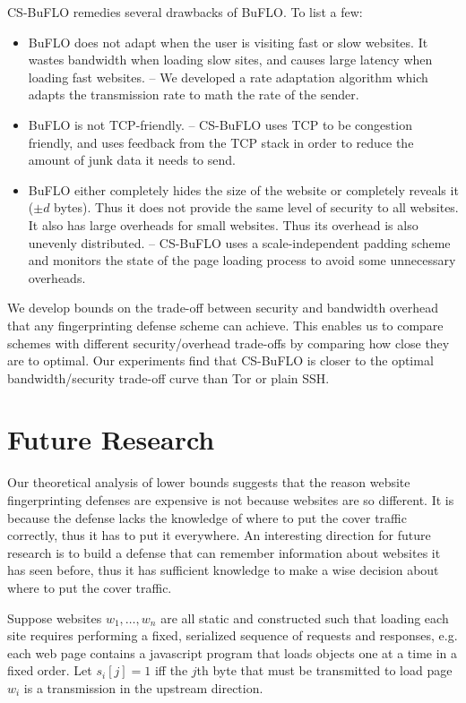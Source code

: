 \documentclass[11pt,oneside]{article}
\newcommand{\buflo} {BuFLO\xspace}
\newcommand{\csb} {CS-BuFLO\xspace}
\begin{document}
\csb remedies several drawbacks of \buflo. To list a few:
\begin{itemize}

\item
\buflo does not adapt when the user is visiting fast or slow websites. It wastes bandwidth when loading slow
sites, and causes large latency when loading fast websites. -- We developed a rate adaptation algorithm which adapts the transmission rate to math the rate of the sender.

\item
\buflo is not TCP-friendly. -- \csb uses TCP to be congestion friendly, and uses feedback from the TCP stack in order to reduce the amount of junk data it needs to send.

\item
\buflo either completely hides the size of the website or completely reveals it ($\pm d$ bytes).  Thus it does not provide the same level of security to all websites. It also has large overheads for small websites.  Thus its overhead is also unevenly distributed. -- \csb uses a scale-independent padding scheme and monitors the state of the page loading process to avoid some unnecessary overheads.

\end{itemize}

We develop bounds on the trade-off between security and bandwidth overhead that any fingerprinting defense scheme can achieve. This enables us to compare schemes with different security/overhead trade-offs by comparing how close they are to optimal. Our experiments find that \csb is closer to the optimal bandwidth/security trade-off curve than Tor or plain SSH.

\section{Future Research}

Our theoretical analysis of lower bounds suggests that the reason website fingerprinting defenses are expensive is not because
websites are so different. It is because the defense lacks the knowledge of where to put the cover traffic correctly,
thus it has to put it everywhere. An interesting direction for future research is to build a defense that can remember
information about websites it has seen before, thus it has sufficient knowledge to make a wise decision about where
to put the cover traffic.

Suppose websites $w_1,\dots,w_n$ are all static and constructed such
that loading each site requires performing a fixed, serialized
sequence of requests and responses, e.g. each web page contains a
javascript program that loads objects one at a time in a fixed order.
Let $s_i[j]=1$ iff the $j$th byte that must be transmitted to load
page $w_i$ is a transmission in the upstream direction.  
\end{document}
